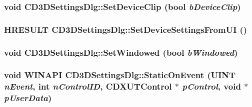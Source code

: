 \label{class_c_d3_d_settings_dlg_a78ee87995db6417e18e597610f119212}
\hypertarget{class_c_d3_d_settings_dlg_ab5e85523266807441c34a4439163550f}{
\subsubsection[{SetDeviceClip}]{\setlength{\rightskip}{0pt plus 5cm}void CD3DSettingsDlg::SetDeviceClip (bool {\em bDeviceClip})}}
\label{class_c_d3_d_settings_dlg_ab5e85523266807441c34a4439163550f}
\hypertarget{class_c_d3_d_settings_dlg_a12d42c7cb4fc734538eeafff7d979215}{
\subsubsection[{SetDeviceSettingsFromUI}]{\setlength{\rightskip}{0pt plus 5cm}HRESULT CD3DSettingsDlg::SetDeviceSettingsFromUI ()}}
\label{class_c_d3_d_settings_dlg_a12d42c7cb4fc734538eeafff7d979215}
\hypertarget{class_c_d3_d_settings_dlg_a1a8187c3c56b9998c25d7fb4fc1c5ab8}{
\subsubsection[{SetWindowed}]{\setlength{\rightskip}{0pt plus 5cm}void CD3DSettingsDlg::SetWindowed (bool {\em bWindowed})}}
\label{class_c_d3_d_settings_dlg_a1a8187c3c56b9998c25d7fb4fc1c5ab8}
\hypertarget{class_c_d3_d_settings_dlg_a55cc59820bc86efb9819739110f9190f}{
\subsubsection[{StaticOnEvent}]{\setlength{\rightskip}{0pt plus 5cm}void WINAPI CD3DSettingsDlg::StaticOnEvent (UINT {\em nEvent}, \/  {\bf int} {\em nControlID}, \/  {\bf CDXUTControl} $\ast$ {\em pControl}, \/  void $\ast$ {\em pUserData})}}
\label{class_c_d3_d_settings_dlg_a55cc59820bc86efb9819739110f9190f}


